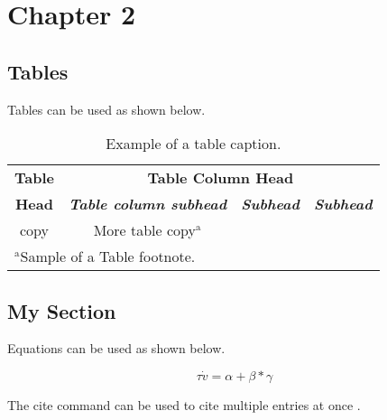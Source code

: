 \chapter{Chapter 2}
\label{chap:ch2}

\section{Tables}
Tables can be used as shown below.

\begin{table}
 \caption{Example of a table caption.}
 \begin{center}
  \begin{tabular}{|c|c|c|c|}                                                                                                   \hline
   \textbf{Table} & \multicolumn{3}{|c|}{\textbf{Table Column Head}}                                                         \\\cline{2-4}
   \textbf{Head}  & \textbf{\textit{Table column subhead}}           & \textbf{\textit{Subhead}} & \textbf{\textit{Subhead}} \\\hline
   copy           & More table copy$^{\mathrm{a}}$                   &                           &                           \\\hline
   \multicolumn{4}{l}{$^{\mathrm{a}}$Sample of a Table footnote.}
  \end{tabular}
  \label{tb:table}
 \end{center}
\end{table}


\section{My Section}
\label{sec:my}
Equations can be used as shown below.

\begin{equation}
 \tau \dot{v} = \alpha + \beta * \gamma
\end{equation}

The cite command can be used to cite multiple entries at once \cite{gree00,phil99,jame76}.
